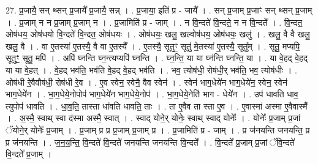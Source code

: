 \documentclass[17pt]{extarticle}
\begin{document}
27. प्र॒जायै॒ सन् थ्सन् प्र॒जायै᳚ प्र॒जायै॒ सन्न् । . प्र॒जाया॒ इति॑ प्र - जायै᳚ । . सन् प्र॒जाम् प्र॒जाꣳ सन् थ्सन् प्र॒जाम् । . प्र॒जाम् न न प्र॒जाम् प्र॒जाम् न । . प्र॒जामिति॑ प्र - जाम् । . न वि॒न्दते॑ वि॒न्दते॒ न न वि॒न्दते᳚ । . वि॒न्दत॒ ओष॑धय॒ ओष॑धयो वि॒न्दते॑ वि॒न्दत॒ ओष॑धयः । . ओष॑धयः॒ खलु॒ खल्वोष॑धय॒ ओष॑धयः॒ खलु॑ । . खलु॒ वै वै खलु॒ खलु॒ वै । . वा ए॒तस्या॑ ए॒तस्यै॒ वै वा ए॒तस्यै᳚ । . ए॒तस्यै॒ सूतुꣳ॒॒ सूतु॑ मे॒तस्या॑ ए॒तस्यै॒ सूतु᳚म् । . सूतु॒ मप्यपि॒ सूतुꣳ॒॒ सूतु॒ मपि॑ । . अपि॑ घ्नन्ति घ्न॒न्त्यप्यपि॑ घ्नन्ति । . घ्न॒न्ति॒ या या घ्न॑न्ति घ्नन्ति॒ या । . या वे॒हद् वे॒हद् या या वे॒हत् । . वे॒हद् भव॑ति॒ भव॑ति वे॒हद् वे॒हद् भव॑ति । . भव॒ त्योष॑धी॒ रोष॑धी॒र् भव॑ति॒ भव॒ त्योष॑धीः । . ओष॑धी रे॒वैवौष॑धी॒ रोष॑धी रे॒व । . ए॒व स्वेन॒ स्वेनै॒ वैव स्वेन॑ । . स्वेन॑ भाग॒धेये॑न भाग॒धेये॑न॒ स्वेन॒ स्वेन॑ भाग॒धेये॑न । . भा॒ग॒धेये॒नोपोप॑ भाग॒धेये॑न भाग॒धेये॒नोप॑ । . भा॒ग॒धेये॒नेति॑ भाग - धेये॑न । . उप॑ धावति धाव॒ त्युपोप॑ धावति । . धा॒व॒ति॒ तास्ता धा॑वति धावति॒ ताः । . ता ए॒वैव ता स्ता ए॒व । . ए॒वास्मा॑ अस्मा ए॒वैवास्मै᳚ । . अ॒स्मै॒ स्वाथ् स्वा द॑स्मा अस्मै॒ स्वात् । . स्वाद् योने॒र् योनेः॒ स्वाथ् स्वाद् योनेः᳚ । . योनेः᳚ प्र॒जाम् प्र॒जां ॅयोने॒र् योनेः᳚ प्र॒जाम् । . प्र॒जाम् प्र प्र प्र॒जाम् प्र॒जाम् प्र । . प्र॒जामिति॑ प्र - जाम् । . प्र ज॑नयन्ति जनयन्ति॒ प्र प्र ज॑नयन्ति । . ज॒न॒य॒न्ति॒ वि॒न्दते॑ वि॒न्दते॑ जनयन्ति जनयन्ति वि॒न्दते᳚ । . वि॒न्दते᳚ प्र॒जाम् प्र॒जां ॅवि॒न्दते॑ वि॒न्दते᳚ प्र॒जाम् । \newline
\end{document}
